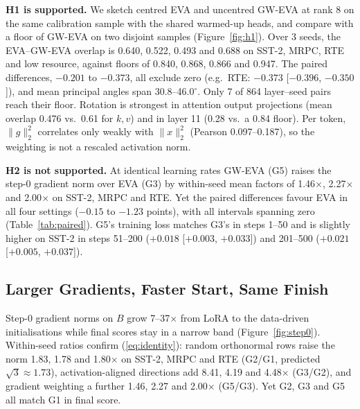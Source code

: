 \documentclass[letterpaper]{article} %
\newcommand{\norm}[1]{\lVert #1\rVert}
\begin{document}
\textbf{H1 is supported.} We sketch centred EVA and uncentred GW-EVA at rank 8 on the same calibration sample with the shared warmed-up heads, and compare with a floor of GW-EVA on two disjoint samples (Figure~\ref{fig:h1}). Over 3 seeds, the EVA--GW-EVA overlap is 0.640, 0.522, 0.493 and 0.688 on SST-2, MRPC, RTE and low resource, against floors of 0.840, 0.868, 0.866 and 0.947. The paired differences, $-0.201$ to $-0.373$, all exclude zero (e.g.\ RTE: $-0.373$ [$-0.396$, $-0.350$]), and mean principal angles span 30.8--46.0$^\circ$. Only 7 of 864 layer--seed pairs reach their floor. Rotation is strongest in attention output projections (mean overlap 0.476 vs.\ 0.61 for $k,v$) and in layer 11 (0.28 vs.\ a 0.84 floor). Per token, $\norm{g}_2^2$ correlates only weakly with $\norm{x}_2^2$ (Pearson 0.097--0.187), so the weighting is not a rescaled activation norm.

\textbf{H2 is not supported.} At identical learning rates GW-EVA (G5) raises the step-0 gradient norm over EVA (G3) by within-seed mean factors of 1.46$\times$, 2.27$\times$ and 2.00$\times$ on SST-2, MRPC and RTE. Yet the paired differences favour EVA in all four settings ($-0.15$ to $-1.23$ points), with all intervals spanning zero (Table~\ref{tab:paired}). G5's training loss matches G3's in steps 1--50 and is slightly higher on SST-2 in steps 51--200 ($+0.018$ [$+0.003$, $+0.033$]) and 201--500 ($+0.021$ [$+0.005$, $+0.037$]).

\subsection{Larger Gradients, Faster Start, Same Finish}
\label{sec:step0}


Step-0 gradient norms on $B$ grow 7--37$\times$ from LoRA to the data-driven initialisations while final scores stay in a narrow band (Figure~\ref{fig:step0}). Within-seed ratios confirm (\ref{eq:identity}): random orthonormal rows raise the norm 1.83, 1.78 and 1.80$\times$ on SST-2, MRPC and RTE (G2/G1, predicted $\sqrt{3}\approx1.73$), activation-aligned directions add 8.41, 4.19 and 4.48$\times$ (G3/G2), and gradient weighting a further 1.46, 2.27 and 2.00$\times$ (G5/G3). Yet G2, G3 and G5 all match G1 in final score.
\end{document}
